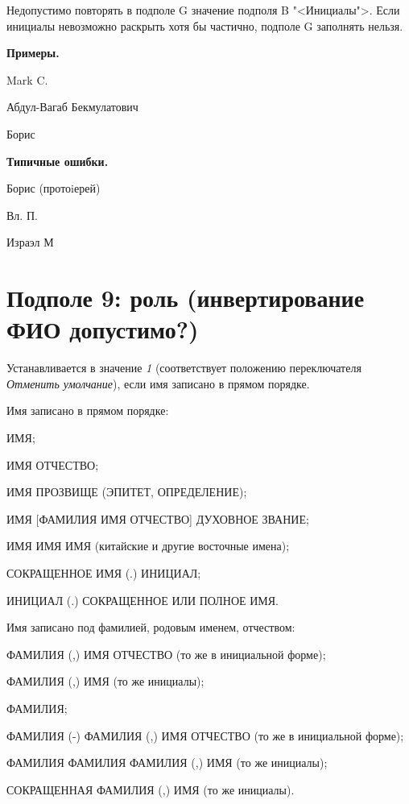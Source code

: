 Недопустимо повторять в подполе G значение подполя B "<Инициалы">. Если инициалы невозможно раскрыть хотя бы частично, подполе G заполнять нельзя.

\textbf{Примеры.}

\begin{cutelist}
    \item Mark C.
    \item Абдул-Вагаб Бекмулатович
    \item Борис
\end{cutelist}

\textbf{Типичные ошибки.}

\begin{cutelist}
    \item Борис (протоiерей)
    \item Вл. П.
    \item Израэл М
\end{cutelist}

\section{Подполе 9: роль (инвертирование ФИО допустимо?)}

Устанавливается в значение \emph{1} (соответствует положению переключателя \emph{Отменить умолчание}), если имя записано в прямом порядке.

Имя записано в прямом порядке:

\begin{cutelist}
    \item ИМЯ;
    \item ИМЯ ОТЧЕСТВО;
    \item ИМЯ ПРОЗВИЩЕ (ЭПИТЕТ, ОПРЕДЕЛЕНИЕ);
    \item ИМЯ [ФАМИЛИЯ ИМЯ ОТЧЕСТВО] ДУХОВНОЕ ЗВАНИЕ;
    \item ИМЯ ИМЯ ИМЯ (китайские и другие восточные имена);
    \item СОКРАЩЕННОЕ ИМЯ (.) ИНИЦИАЛ;
    \item ИНИЦИАЛ (.) СОКРАЩЕННОЕ ИЛИ ПОЛНОЕ ИМЯ.
\end{cutelist}

Имя записано под фамилией, родовым именем, отчеством:

\begin{cutelist}
    \item ФАМИЛИЯ (,) ИМЯ ОТЧЕСТВО (то же в инициальной форме);
    \item ФАМИЛИЯ (,) ИМЯ (то же инициалы);
    \item ФАМИЛИЯ;
    \item ФАМИЛИЯ (-) ФАМИЛИЯ (,) ИМЯ ОТЧЕСТВО (то же в инициальной форме);
    \item ФАМИЛИЯ ФАМИЛИЯ ФАМИЛИЯ (,) ИМЯ (то же инициалы);
    \item СОКРАЩЕННАЯ ФАМИЛИЯ (,) ИМЯ (то же инициалы).
\end{cutelist}

